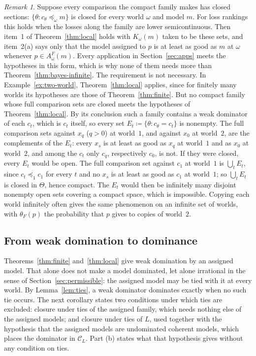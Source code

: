 \documentclass[11pt]{article}
\theoremstyle{definition}
\theoremstyle{remark}
\newtheorem{remark}[theorem]{Remark}
\newcommand{\C}{\mathcal C}
\begin{document}
\begin{remark}\label{rem:closed-comparisons}
Suppose every comparison the compact family makes has closed sections: $\{\theta:c_\theta\preceq_\omega m\}$ is closed for every world $\omega$ and model $m$. For loss rankings this holds when the losses along the family are lower semicontinuous. Then item~1 of Theorem~\ref{thm:local} holds with $K_\omega(m)$ taken to be these sets, and item~2(a) says only that the model assigned to $p$ is at least as good as $m$ at $\omega$ whenever $p\in A^F_\omega(m)$. Every application in Section~\ref{sec:apps} meets the hypotheses in this form, which is why none of them needs more than Theorem~\ref{thm:bayes-infinite}. The requirement is not necessary. In Example~\ref{ex:two-world}, Theorem~\ref{thm:local} applies, since for finitely many worlds its hypotheses are those of Theorem~\ref{thm:finite}. But no compact family whose full comparison sets are closed meets the hypotheses of Theorem~\ref{thm:local}. By its conclusion such a family contains a weak dominator of each $c_t$, which is $c_t$ itself, so every set $E_t\coloneqq\{\theta:c_\theta=c_t\}$ is nonempty. The full comparison sets against $x_q$ ($q>0$) at world~$1$, and against $x_0$ at world~$2$, are the complements of the $E_t$: every $x_s$ is at least as good as $x_q$ at world~$1$ and as $x_0$ at world~$2$, and among the $c_t$ only $c_q$, respectively $c_0$, is not. If they were closed, every $E_t$ would be open. The full comparison set against $c_1$ at world~$1$ is $\bigcup_tE_t$, since $c_t\preceq_1c_1$ for every $t$ and no $x_s$ is at least as good as $c_1$ at world~$1$; so $\bigcup_tE_t$ is closed in $\Theta$, hence compact. The $E_t$ would then be infinitely many disjoint nonempty open sets covering a compact space, which is impossible. Copying each world infinitely often gives the same phenomenon on an infinite set of worlds, with $\theta_F(p)$ the probability that $p$ gives to copies of world~$2$.
\end{remark}

\subsection{From weak domination to dominance}
Theorems~\ref{thm:finite} and~\ref{thm:local} give weak domination by an assigned model. That alone does not make a model dominated, let alone irrational in the sense of Section~\ref{sec:permissible}: the assigned model may be tied with it at every world. By Lemma~\ref{lem:ties}, a weak dominator dominates exactly when no such tie occurs. The next corollary states two conditions under which ties are excluded: closure under ties of the assigned family, which needs nothing else of the assigned models; and closure under ties of $L$, used together with the hypothesis that the assigned models are undominated coherent models, which places the dominator in $\C_L$. Part (b) states what that hypothesis gives without any condition on ties.
\end{document}
